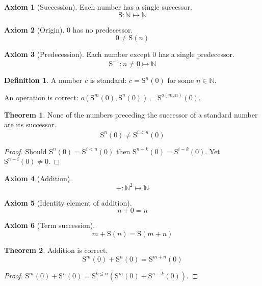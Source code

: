 \documentclass{amsbook}
\theoremstyle{definition}
\newtheorem{axm}{Axiom}[chapter]
\newtheorem{thm}{Theorem}[section]
\newtheorem{dfn}{Definition}[section]
\begin{document}
\newcommand{\suc}{\mathrm S}


\begin{axm}[Succession] Each number has a single successor.
    $$\mathrm S: \mathbb N \longmapsto \mathbb N$$
\end{axm}

\begin{axm}[Origin] 0 has no predecessor.
    $$0 \neq \suc(n)$$
\end{axm}

\begin{axm}[Predecession] Each number except 0 has a single predecessor.
    $$\mathrm S^{-1}: n \neq 0 \longmapsto \mathbb N$$
\end{axm}

\begin{dfn}
    A number $c$ is standard: $c = \suc^n(0)$ for some $n \in \mathbb N$.

    An operation is correct: $o(\suc^m(0), \suc^n(0)) = \suc^{o(m, n)}(0)$.
\end{dfn}

\begin{thm}
    None of the numbers preceding the successor of a standard number are its successor.
    $$\suc^{n}(0) \neq \suc^{i < n}(0)$$
    \begin{proof}
        Should $\suc^{n}(0) = \suc^{i < n}(0)$ then $\suc^{n-k}(0) = \suc^{i-k}(0)$. Yet $\suc^{n-i}(0) \neq 0$.
    \end{proof}
\end{thm}

\begin{axm}[Addition]
    $$+: \mathbb N^2 \longmapsto \mathbb N$$
\end{axm}

\begin{axm}[Identity element of addition]
    $$n + 0 = n$$
\end{axm}

\begin{axm}[Term succession]
    $$m + \mathrm S(n) = \mathrm S(m + n)$$
\end{axm}

\begin{thm}
    Addition is correct.
    $$\suc^m(0) + \suc^n(0) = \suc^{m+n}(0)$$
    \begin{proof}
        $\suc^m(0) + \suc^n(0) = \suc^{k \leq n}(\suc^m(0) + \suc^{n-k}(0))$.
    \end{proof}
\end{thm}
\end{document}
